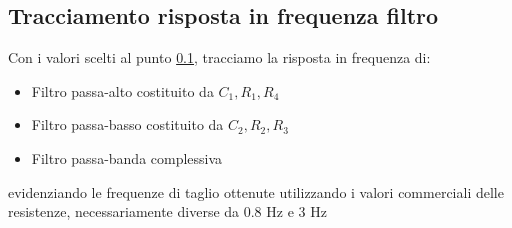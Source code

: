 \subsection{Tracciamento risposta in frequenza filtro}
Con i valori scelti al punto \ref{}, tracciamo la risposta in frequenza di:
\begin{itemize}
    \item Filtro passa-alto costituito da $C_1,R_1,R_4$
    \item Filtro passa-basso costituito da $C_2,R_2,R_3$
    \item Filtro passa-banda complessiva
\end{itemize}
evidenziando le frequenze di taglio ottenute utilizzando i valori commerciali delle resistenze, necessariamente diverse da 0.8 Hz e 3 Hz